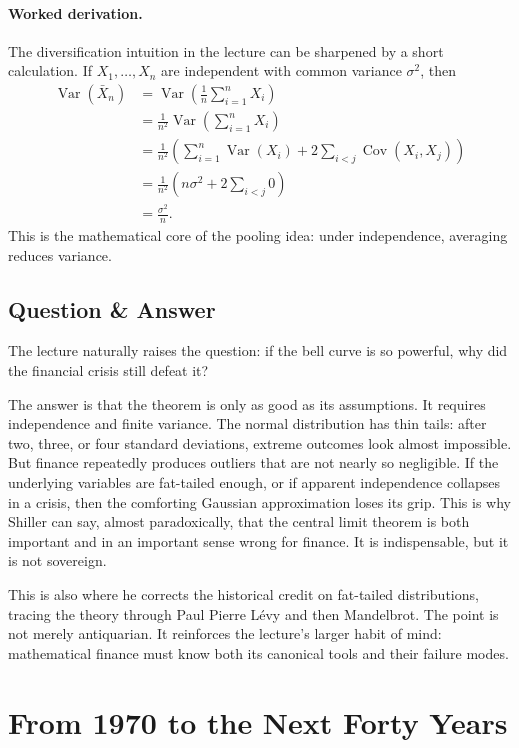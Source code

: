 \paragraph{Worked derivation.}
The diversification intuition in the lecture can be sharpened by a short calculation. If $X_1,\dots,X_n$ are independent with common variance $\sigma^2$, then
\begin{align}
\operatorname{Var}(\bar X_n)
&=\operatorname{Var}\!\left(\frac{1}{n}\sum_{i=1}^n X_i\right)\\
&=\frac{1}{n^2}\operatorname{Var}\!\left(\sum_{i=1}^n X_i\right)\\
&=\frac{1}{n^2}\left(\sum_{i=1}^n \operatorname{Var}(X_i)+2\sum_{i<j}\operatorname{Cov}(X_i,X_j)\right)\\
&=\frac{1}{n^2}\left(n\sigma^2+2\sum_{i<j}0\right)\\
&=\frac{\sigma^2}{n}.
\end{align}
This is the mathematical core of the pooling idea: under independence, averaging reduces variance.

\subsection{Question \& Answer}

The lecture naturally raises the question: if the bell curve is so powerful, why did the financial crisis still defeat it?

The answer is that the theorem is only as good as its assumptions. It requires independence and finite variance. The normal distribution has thin tails: after two, three, or four standard deviations, extreme outcomes look almost impossible. But finance repeatedly produces outliers that are not nearly so negligible. If the underlying variables are fat-tailed enough, or if apparent independence collapses in a crisis, then the comforting Gaussian approximation loses its grip. This is why Shiller can say, almost paradoxically, that the central limit theorem is both important and in an important sense wrong for finance. It is indispensable, but it is not sovereign.

This is also where he corrects the historical credit on fat-tailed distributions, tracing the theory through Paul Pierre L\'evy and then Mandelbrot. The point is not merely antiquarian. It reinforces the lecture's larger habit of mind: mathematical finance must know both its canonical tools and their failure modes.

\section{From 1970 to the Next Forty Years}

